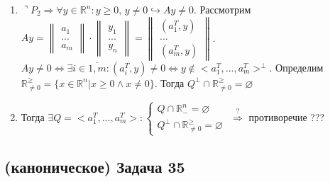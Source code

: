 \documentclass[a4paper]{article}
\def\eqdef{\overset{\mbox{\tiny def}}{=}}
\newcommand{\RR}{\mathbb{R}}
\begin{document}
\begin{enumerate}
\begin{enumerate}
\item $\urcorner P_2\Rightarrow \forall y\in\RR^n\colon y\geqslant 0,\,y\neq 0\hookrightarrow Ay\neq 0$. Рассмотрим $Ay=\begin{Vmatrix}
a_1\\
...\\
a_m
\end{Vmatrix}\cdot\begin{Vmatrix}
y_1\\
...\\
y_n
\end{Vmatrix}=\begin{Vmatrix}
(a_1^T,y)\\
...\\
(a_m^T,y)
\end{Vmatrix}$.\newline
$Ay\neq 0\Leftrightarrow \exists i\in\overline{1,m}\colon (a_i^T,y)\neq 0\Leftrightarrow y\notin <a_1^T,...,a_m^T>^\perp$. Определим $\RR^\geqslant_{\neq 0}=\{x\in\RR^n\big|x\geqslant 0\wedge x\neq 0\}$.\newline
Тогда $Q^\perp\cap\RR^\geqslant_{\neq 0}=\varnothing$
\item Тогда $\exists Q=<a_1^T,...,a_m^T>\colon\begin{cases}
Q\cap \RR^n_-=\varnothing\\
Q^\perp\cap\RR^\geqslant_{\neq 0}=\varnothing
\end{cases}$ $\overset{?}{\Rightarrow}$ противоречие ??? %
\end{enumerate}
\end{enumerate}
\subsection*{(каноническое) Задача 35}
\end{document}
